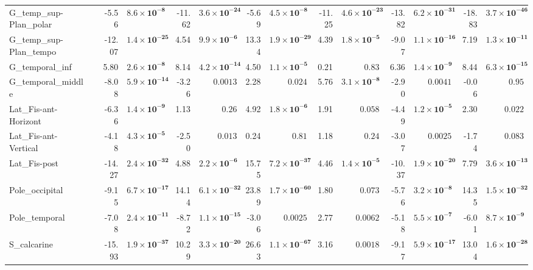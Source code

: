 {\begin{longtable}{llrrrrrrrrrrrr}
G\_temp\_sup-Plan\_polar &  & -5.56 & $\mathbf{8.6{\times}10^{-8}}$ & -11.62 & $\mathbf{3.6{\times}10^{-24}}$ & -5.69 & $\mathbf{4.5{\times}10^{-8}}$ & -11.25 & $\mathbf{4.6{\times}10^{-23}}$ & -13.82 & $\mathbf{6.2{\times}10^{-31}}$ & -18.83 & $\mathbf{3.7{\times}10^{-46}}$ \\
G\_temp\_sup-Plan\_tempo &  & -12.07 & $\mathbf{1.4{\times}10^{-25}}$ & 4.54 & $\mathbf{9.9{\times}10^{-6}}$ & 13.34 & $\mathbf{1.9{\times}10^{-29}}$ & 4.39 & $\mathbf{1.8{\times}10^{-5}}$ & -9.07 & $\mathbf{1.1{\times}10^{-16}}$ & 7.19 & $\mathbf{1.3{\times}10^{-11}}$ \\
G\_temporal\_inf &  & 5.80 & $\mathbf{2.6{\times}10^{-8}}$ & 8.14 & $\mathbf{4.2{\times}10^{-14}}$ & 4.50 & $\mathbf{1.1{\times}10^{-5}}$ & 0.21 & $0.83$ & 6.36 & $\mathbf{1.4{\times}10^{-9}}$ & 8.44 & $\mathbf{6.3{\times}10^{-15}}$ \\
G\_temporal\_middle &  & -8.08 & $\mathbf{5.9{\times}10^{-14}}$ & -3.26 & $0.0013$ & 2.28 & $0.024$ & 5.76 & $\mathbf{3.1{\times}10^{-8}}$ & -2.90 & $0.0041$ & -0.06 & $0.95$ \\
Lat\_Fis-ant-Horizont &  & -6.36 & $\mathbf{1.4{\times}10^{-9}}$ & 1.13 & $0.26$ & 4.92 & $\mathbf{1.8{\times}10^{-6}}$ & 1.91 & $0.058$ & -4.49 & $\mathbf{1.2{\times}10^{-5}}$ & 2.30 & $0.022$ \\
Lat\_Fis-ant-Vertical &  & -4.18 & $\mathbf{4.3{\times}10^{-5}}$ & -2.50 & $0.013$ & 0.24 & $0.81$ & 1.18 & $0.24$ & -3.07 & $0.0025$ & -1.74 & $0.083$ \\
Lat\_Fis-post &  & -14.27 & $\mathbf{2.4{\times}10^{-32}}$ & 4.88 & $\mathbf{2.2{\times}10^{-6}}$ & 15.75 & $\mathbf{7.2{\times}10^{-37}}$ & 4.46 & $\mathbf{1.4{\times}10^{-5}}$ & -10.37 & $\mathbf{1.9{\times}10^{-20}}$ & 7.79 & $\mathbf{3.6{\times}10^{-13}}$ \\
Pole\_occipital &  & -9.15 & $\mathbf{6.7{\times}10^{-17}}$ & 14.14 & $\mathbf{6.1{\times}10^{-32}}$ & 23.89 & $\mathbf{1.7{\times}10^{-60}}$ & 1.80 & $0.073$ & -5.76 & $\mathbf{3.2{\times}10^{-8}}$ & 14.35 & $\mathbf{1.5{\times}10^{-32}}$ \\
Pole\_temporal &  & -7.08 & $\mathbf{2.4{\times}10^{-11}}$ & -8.72 & $\mathbf{1.1{\times}10^{-15}}$ & -3.06 & $0.0025$ & 2.77 & $0.0062$ & -5.18 & $\mathbf{5.5{\times}10^{-7}}$ & -6.01 & $\mathbf{8.7{\times}10^{-9}}$ \\
S\_calcarine &  & -15.93 & $\mathbf{1.9{\times}10^{-37}}$ & 10.29 & $\mathbf{3.3{\times}10^{-20}}$ & 26.63 & $\mathbf{1.1{\times}10^{-67}}$ & 3.16 & $0.0018$ & -9.17 & $\mathbf{5.9{\times}10^{-17}}$ & 13.04 & $\mathbf{1.6{\times}10^{-28}}$ \\

\end{longtable}}
